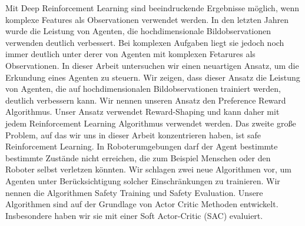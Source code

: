 
\Abstract
Mit Deep Reinforcement Learning sind beeindruckende Ergebnisse möglich, wenn komplexe Features als Observationen verwendet werden. In den letzten Jahren wurde die Leistung von Agenten, die hochdimensionale Bildobservationen verwenden deutlich verbessert. Bei komplexen Aufgaben liegt sie jedoch noch immer deutlich unter derer von Agenten mit komplexen Fetarures als Observationen. In dieser Arbeit untersuchen wir einen neuartigen Ansatz, um die Erkundung eines Agenten zu steuern. Wir zeigen, dass dieser Ansatz die Leistung von Agenten, die auf hochdimensionalen Bildobservationen trainiert werden, deutlich verbessern kann. Wir nennen unseren Ansatz den Preference Reward Algorithmus. Unser Ansatz verwendet Reward-Shaping und kann daher mit jedem Reinforcement Learning Algorithmus verwendet werden. Das zweite große Problem, auf das wir uns in dieser Arbeit konzentrieren haben, ist safe Reinforcement Learning. In Roboterumgebungen darf der Agent bestimmte bestimmte Zustände nicht erreichen, die zum Beispiel Menschen oder den Roboter selbst verletzen könnten. Wir schlagen zwei neue Algorithmen vor, um Agenten unter Berücksichtigung solcher Einschränkungen zu trainieren. Wir nennen die Algorithmen Safety Training und Safety Evaluation. Unsere Algorithmen sind auf der Grundlage von Actor Critic Methoden entwickelt. Insbesondere haben wir sie mit einer Soft Actor-Critic (SAC) evaluiert.

